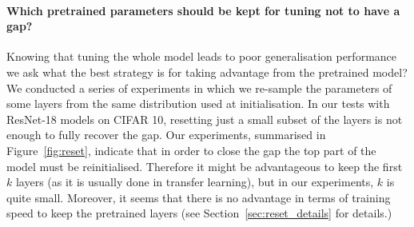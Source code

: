 \paragraph{Which pretrained parameters should be kept for tuning not to have a gap?} Knowing that tuning the whole model leads to poor generalisation performance we ask what the best strategy is for taking advantage from the pretrained model?
We conducted a series of experiments in which we re-sample the parameters of some layers from the same distribution used at initialisation. In our tests with ResNet-18 models on CIFAR 10, resetting just a small subset of the layers is not enough to fully recover the gap. Our experiments, summarised in Figure~\ref{fig:reset}, indicate that in order to close the gap the top part of the model must be reinitialised.
Therefore it might be advantageous to keep the first $k$ layers (as it is usually done in transfer learning), but in our experiments, $k$ is quite small. Moreover, it seems that there is no advantage in terms of training speed to keep the pretrained layers (see Section~\ref{sec:reset_details} for details.)